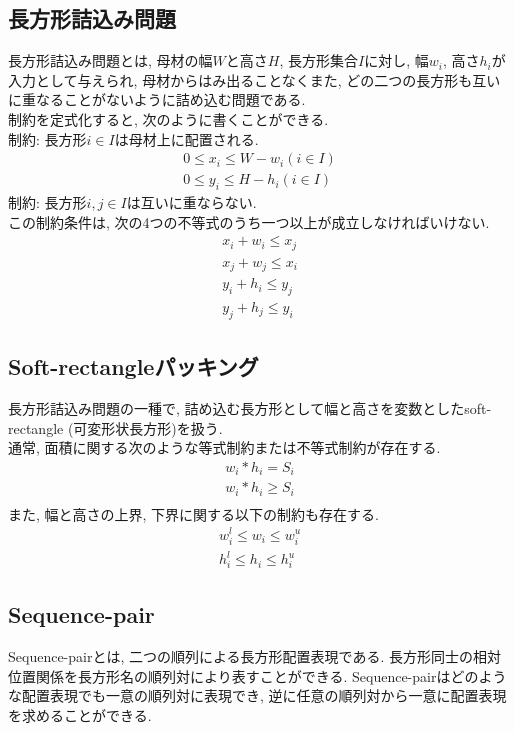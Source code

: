 \subsection{長方形詰込み問題}
長方形詰込み問題とは, 母材の幅$W$と高さ$H$, 長方形集合$I$に対し, 幅$w_i$, 高さ$h_i$が入力として与えられ, 母材からはみ出ることなくまた, どの二つの長方形も互いに重なることがないように詰め込む問題である. \\
制約を定式化すると, 次のように書くことができる. \\
制約: 長方形$i \in I$は母材上に配置される. \\
\begin{eqnarray}
    0 \leq x_i \leq W-w_i (i \in I)\\
    0 \leq y_i \leq H-h_i (i \in I)
\end{eqnarray}
制約: 長方形$i,j \in I$は互いに重ならない. \\
この制約条件は, 次の4つの不等式のうち一つ以上が成立しなければいけない.  
\begin{eqnarray}
    x_i + w_i \leq x_j \\
    x_j + w_j \leq x_i \\
    y_i + h_i \leq y_j \\
    y_j + h_j \leq y_i
\end{eqnarray}

\subsection{Soft-rectangleパッキング}
長方形詰込み問題の一種で, 詰め込む長方形として幅と高さを変数としたsoft-rectangle (可変形状長方形)を扱う\cite{soft-rectangle}. \\
通常, 面積に関する次のような等式制約または不等式制約が存在する. \\
\begin{eqnarray}
    w_i * h_i = S_i \\
    w_i * h_i \geq S_i \\
\end{eqnarray}
また, 幅と高さの上界, 下界に関する以下の制約も存在する. 
\begin{eqnarray}
    w_i^l \leq w_i \leq w_i^u \\
    h_i^l \leq h_i \leq h_i^u
\end{eqnarray}

\subsection{Sequence-pair}
Sequence-pairとは, 二つの順列による長方形配置表現である\cite{seq-pair}. 
長方形同士の相対位置関係を長方形名の順列対により表すことができる. 
Sequence-pairはどのような配置表現でも一意の順列対に表現でき, 逆に任意の順列対から一意に配置表現を求めることができる. 


